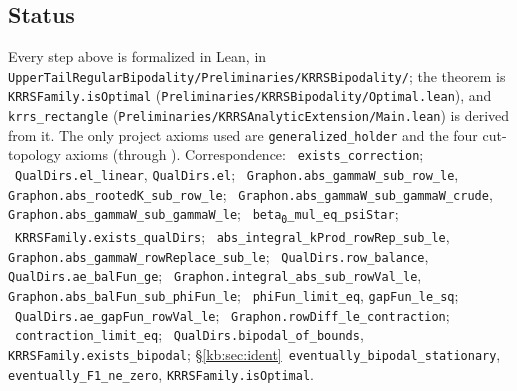 \subsection{Status}
\label{kb:sec:status}
Every step above is formalized in Lean, in \texttt{UpperTailRegularBipodality/Preliminaries/KRRSBipodality/}; the
theorem is \texttt{KRRSFamily.isOptimal} (\texttt{Preliminaries/KRRSBipodality/Optimal.lean}), and
\texttt{krrs\_rectangle} (\texttt{Preliminaries/KRRSAnalyticExtension/Main.lean}) is derived from it.  The only project axioms
used are \texttt{generalized\_holder} and the four cut-topology axioms (through
).  Correspondence:
~\texttt{exists\_correction};
~\texttt{QualDirs.el\_linear}, \texttt{QualDirs.el};
~\texttt{Graphon.abs\_gammaW\_sub\_row\_le},
\texttt{Graphon.abs\_rootedK\_sub\_row\_le};
~\texttt{Graphon.abs\_gammaW\_sub\_gammaW\_crude},
\texttt{Graphon.abs\_gammaW\_sub\_gammaW\_le};
~\texttt{beta\textsubscript{0}\_mul\_eq\_psiStar};
~\texttt{KRRSFamily.exists\_qualDirs};
~\texttt{abs\_integral\_kProd\_rowRep\_sub\_le},
\texttt{Graphon.abs\_gammaW\_rowReplace\_sub\_le};
~\texttt{QualDirs.row\_balance}, \texttt{QualDirs.ae\_balFun\_ge};
~\texttt{Graphon.integral\_abs\_sub\_rowVal\_le},
\texttt{Graphon.abs\_balFun\_sub\_phiFun\_le};
~\texttt{phiFun\_limit\_eq}, \texttt{gapFun\_le\_sq};
~\texttt{QualDirs.ae\_gapFun\_rowVal\_le};
~\texttt{Graphon.rowDiff\_le\_contraction};
~\texttt{contraction\_limit\_eq};
~\texttt{QualDirs.bipodal\_of\_bounds},
\texttt{KRRSFamily.exists\_bipodal};
\S\ref{kb:sec:ident}~\texttt{eventually\_bipodal\_stationary},
\texttt{eventually\_F1\_ne\_zero}, \texttt{KRRSFamily.isOptimal}.
